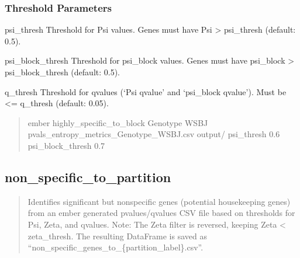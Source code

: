 \documentclass[letterpaper,10pt,english]{sphinxmanual}
\begin{document}
\subsubsection{Threshold Parameters}
\label{\detokenize{cli:threshold-parameters_repeat1}}\begin{optionlist}{3cm}
\item [\sphinxhyphen{}\sphinxhyphen{}psi\_thresh]  
\sphinxAtStartPar
Threshold for Psi values. Genes must have Psi \textgreater{} psi\_thresh (default: 0.5).
\item [\sphinxhyphen{}\sphinxhyphen{}psi\_block\_thresh]  
\sphinxAtStartPar
Threshold for psi\_block values. Genes must have psi\_block \textgreater{} psi\_block\_thresh (default: 0.5).
\item [\sphinxhyphen{}\sphinxhyphen{}q\_thresh]  
\sphinxAtStartPar
Threshold for q\sphinxhyphen{}values (‘Psi q\sphinxhyphen{}value’ and ‘psi\_block q\sphinxhyphen{}value’). Must be \textless{}= q\_thresh (default: 0.05).
\end{optionlist}
\begin{quote}
\begin{description}
\sphinxAtStartPar
ember highly\_specific\_to\_block Genotype WSBJ pvals\_entropy\_metrics\_Genotype\_WSBJ.csv output/ \textendash{}psi\_thresh 0.6 \textendash{}psi\_block\_thresh 0.7

\end{description}
\end{quote}


\subsection{non\_specific\_to\_partition}
\label{\detokenize{cli:non_specific_to_partition}}\begin{quote}

\sphinxAtStartPar
Identifies significant but non\sphinxhyphen{}specific genes (potential housekeeping genes) from an ember generated
p\sphinxhyphen{}values/q\sphinxhyphen{}values CSV file based on thresholds for Psi, Zeta, and q\sphinxhyphen{}values.
Note: The Zeta filter is reversed, keeping Zeta \textless{} zeta\_thresh.
The resulting DataFrame is saved as “non\_specific\_genes\_to\_\{partition\_label\}.csv”.
\end{quote}

\begin{sphinxVerbatim}[commandchars=\\\{\}]
  \PYG{p}{[}\PYG{p}{]} \PYG{p}{[} \PYG{p}{]} \PYG{p}{[} \PYG{p}{]} \PYG{p}{[} \PYG{p}{]}
                                  
\end{sphinxVerbatim}
\end{document}
